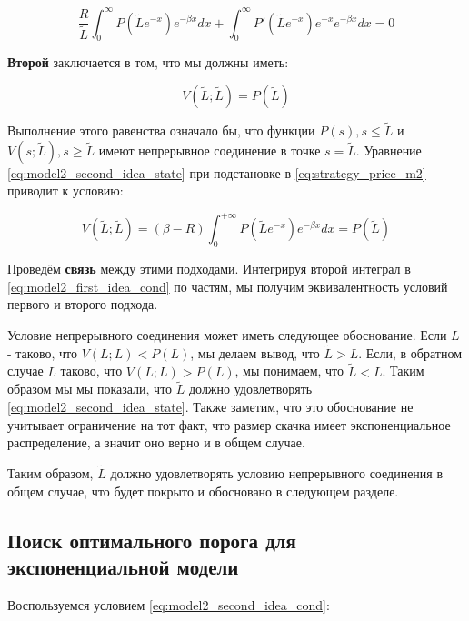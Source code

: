 \documentclass[a4paper,12pt]{article}
\theoremstyle{definition}
\begin{document}
\begin{equation}\label{eq:model2_first_idea_cond}
    \frac{R}{\tilde{L}} \int_{0}^{\infty} P(\tilde{L} e^{-x}) e^{-\beta x} dx + \int_{0}^{\infty} P'(\tilde{L} e^{-x}) e^{-x} e^{-\beta x} dx = 0
\end{equation}

\textbf{Второй} заключается в том, что мы должны иметь:

\begin{equation}\label{eq:model2_second_idea_state}
    V(\tilde{L}; \tilde{L}) = P(\tilde{L})
\end{equation}

Выполнение этого равенства означало бы, что функции $P(s), s \le \tilde{L}$ и $V(s; \tilde{L}), s \ge \tilde{L}$ имеют непрерывное соединение в точке $s = \tilde{L}$. Уравнение \eqref{eq:model2_second_idea_state} при подстановке в \eqref{eq:strategy_price_m2} приводит к условию:

\begin{equation}\label{eq:model2_second_idea_cond}
    V(\tilde{L}; \tilde{L}) = (\beta - R) \int_{0}^{+\infty} P(\tilde{L} e^{-x}) e^{-\beta x} dx = P(\tilde{L})
\end{equation}

Проведём \textbf{связь} между этими подходами. Интегрируя второй интеграл в \eqref{eq:model2_first_idea_cond} по частям, мы получим эквивалентность условий первого и второго подхода.

Условие непрерывного соединения может иметь следующее обоснование. Если $L$ - таково, что $V(L; L) < P(L)$, мы делаем вывод, что $\tilde{L} > L$. Если, в обратном случае $L$ таково, что $V(L; L) > P(L)$, мы понимаем, что $\tilde{L} < L$. Таким образом мы мы показали, что $\tilde{L}$ должно удовлетворять \eqref{eq:model2_second_idea_state}. Также заметим, что это обоснование не учитывает ограничение на тот факт, что размер скачка имеет экспоненциальное распределение, а значит оно верно и в общем случае.

Таким образом, $\tilde{L}$ должно удовлетворять условию непрерывного соединения в общем случае, что будет покрыто и обосновано в следующем разделе.

\subsection{Поиск оптимального порога для экспоненциальной модели}

Воспользуемся условием \eqref{eq:model2_second_idea_cond}:
\end{document}
